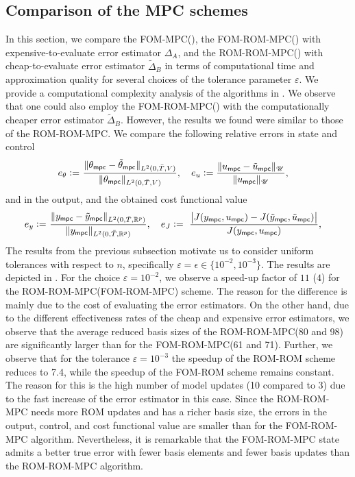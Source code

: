 \documentclass[reqno]{amsart}
\newcommand{\ReA}[1]{{\color{black}#1}}
\newcommand{\U}{{\mathscr U}}
\newcommand{\R}{\mathbb R}
\newcommand{\state}{\theta}
\newcommand{\inpVar}{u}
\newcommand{\outVar}{y}
\newcommand{\outVarDim}{p}
\newcommand{\stateMPC}{\state_{\mathsf{mpc}}}
\newcommand{\inpVarMPC}{\inpVar_{\mathsf{mpc}}}
\newcommand{\outVarMPC}{\outVar_{\mathsf{mpc}}}
\newcommand{\reduce}[1]{\tilde{#1}}
\newcommand{\stateRed}{\reduce{\state}}
\newcommand{\inpVarRed}{\reduce{\inpVar}}
\newcommand{\outVarRed}{\reduce{\outVar}}
\newcommand{\inpVarRedMPC}{\inpVarRed_{\mathsf{mpc}}}
\newcommand{\outVarRedMPC}{\outVarRed_{\mathsf{mpc}}}
\newcommand{\stateRedMPC}{{\stateRed}_{\mathsf{mpc}}}
\newcommand{\abbr}[1]{\textsf{#1}\xspace}
\newcommand{\FOM}{\abbr{FOM}}
\newcommand{\ROM}{\abbr{ROM}}
\newcommand{\MPC}{\abbr{MPC}}
\begin{document}
\subsection{Comparison of the MPC schemes}
\label{subsec:numerics:MPC}

%
In this section, we compare the \FOM-\MPC (), the \FOM-\ROM-\MPC () with expensive-to-evaluate error estimator $\Delta_A$, and the \ROM-\ROM-\MPC () with cheap-to-evaluate error estimator $\reduce \Delta_{B}$ in terms of computational time and approximation quality for several choices of the tolerance parameter $\varepsilon$. \ReA{We provide a computational complexity analysis of the algorithms in \Cref{app:sec_complexity}.} We observe that one could also employ the \FOM-\ROM-\MPC () with the computationally cheaper error estimator $\reduce\Delta_{B}$. However, the results we found were similar to those of the \ROM-\ROM-\MPC. We compare the following relative errors in state and control
%
\begin{align*}
    e_\state \vcentcolon= &\ \frac{\|\stateMPC-{\stateRedMPC}\|_{L^2(0,\bar T, V)}}{\|\stateMPC\|_{L^2(0,\bar T, V)}}, \quad e_u \vcentcolon= \frac{\|\inpVarMPC-\inpVarRedMPC\|_{\U}}{\|\inpVarMPC\|_{\U}},
\end{align*}
%
and in the output, and the obtained cost functional value
%
\begin{align*}
    e_y \vcentcolon= &\ \frac{\|\outVarMPC-{\outVarRedMPC}\|_{L^2(0,\bar T, \R^{\outVarDim})}}{\|\outVarMPC\|_{L^2(0,\bar T, \R^{\outVarDim})}}, \quad e_{ J}\vcentcolon= \ \frac{\big|J(\outVarMPC, \inpVarMPC) -J(\outVarRedMPC, \inpVarRedMPC)\big|}{J(\outVarMPC, \inpVarMPC)},
\end{align*}
%
The results from the previous subsection motivate us to consider uniform tolerances with respect to $n$, specifically $\varepsilon=\epsilon\in\{10^{-2},10^{-3} \}$. The results are depicted in . For the choice $\varepsilon=10^{-2}$, we observe a speed-up factor of $11$ ($4$) for the \ROM-\ROM-\MPC (\FOM-\ROM-\MPC) scheme. The reason for the difference is mainly due to the cost of evaluating the error estimators. On the other hand, due to the different effectiveness rates of the cheap and expensive error estimators, we observe that the average reduced basis sizes of the \ROM-\ROM-\MPC (80 and 98) are significantly larger than for the \FOM-\ROM-\MPC (61 and 71). Further, we observe that for the tolerance $\varepsilon=10^{-3}$ the speedup of the \ROM-\ROM scheme reduces to 7.4, while the speedup of the \FOM-\ROM scheme remains constant. The reason for this is the high number of model updates (10 compared to 3) due to the fast increase of the error estimator in this case. Since the \ROM-\ROM-\MPC needs more \ROM updates and has a richer basis size, the errors in the output, control, and cost functional value are smaller than for the \FOM-\ROM-\MPC algorithm. Nevertheless, it is remarkable that the \FOM-\ROM-\MPC state admits a better true error with fewer basis elements and fewer basis updates than the \ROM-\ROM-\MPC algorithm.
\end{document}
